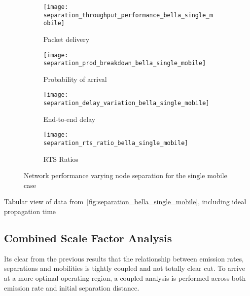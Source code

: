 \begin{figure}[bp!]
	\begin{subfigure}[t]{0.5\textwidth}
		\centering
		\texttt{[image: separation\_throughput\_performance\_bella\_single\_mobile]}
		\caption{Packet delivery}
		\label{fig:separation_throughput_performance_bella_single_mobile}
	\end{subfigure}
	\begin{subfigure}[t]{0.5\textwidth}
		\centering
		\texttt{[image: separation\_prod\_breakdown\_bella\_single\_mobile]}
		\caption{Probability of arrival}
		\label{fig:separation_prod_breakdown_bella_single_mobile}
	\end{subfigure}
	
	\begin{subfigure}[t]{0.5\textwidth}
		\centering
		\texttt{[image: separation\_delay\_variation\_bella\_single\_mobile]}
		\caption{End-to-end delay}
		\label{fig:separation_delay_variation_bella_single_mobile}
	\end{subfigure}
	\begin{subfigure}[t]{0.5\textwidth}
		\centering
		\texttt{[image: separation\_rts\_ratio\_bella\_single\_mobile]}
		\caption{RTS Ratios}
		\label{fig:separation_rts_ratio_bella_single_mobile}
	\end{subfigure}
	\caption{Network performance varying node separation for the single mobile case}
	\label{fig:separation_bella_single_mobile}
\end{figure}


\begin{table}[h]
	\caption{Tabular view of data from~\autoref{fig:separation_bella_single_mobile}, including ideal propagation time} \label{tab:separation_bella_single_mobile}
	\begin{center}
		
	\end{center}
\end{table}

\clearpage

\subsection{Combined Scale Factor Analysis}\label{sec:combined-scale-factor-analysis}

Its clear from the previous results that the relationship between emission rates, separations and mobilities is tightly coupled and not totally clear cut. 
To arrive at a more optimal operating region, a coupled analysis is performed across both emission rate and initial separation distance.

